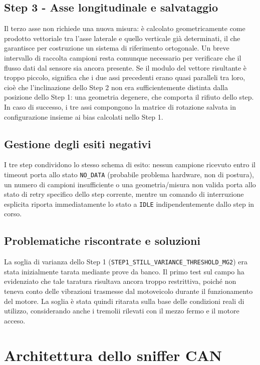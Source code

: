 \subsection{Step 3 - Asse longitudinale e salvataggio}
Il terzo asse non richiede una nuova misura: è calcolato geometricamente come
prodotto vettoriale tra l'asse laterale e quello verticale già determinati,
il che garantisce per costruzione un sistema di riferimento ortogonale. Un
breve intervallo di raccolta campioni resta comunque necessario per
verificare che il flusso dati dal sensore sia ancora presente. Se il modulo
del vettore risultante è troppo piccolo, significa che i due assi precedenti
erano quasi paralleli tra loro, cioè che l'inclinazione dello Step 2 non era
sufficientemente distinta dalla posizione dello Step 1: una geometria
degenere, che comporta il rifiuto dello step. In caso di successo, i tre
assi compongono la matrice di rotazione salvata in configurazione insieme ai
bias calcolati nello Step 1.

\subsection{Gestione degli esiti negativi}
I tre step condividono lo stesso schema di esito: nessun campione ricevuto
entro il timeout porta allo stato \texttt{NO\_DATA} (probabile problema
hardware, non di postura), un numero di campioni insufficiente o una
geometria/misura non valida porta allo stato di retry specifico dello step
corrente, mentre un comando di interruzione esplicita riporta immediatamente
lo stato a \texttt{IDLE} indipendentemente dallo step in corso.

\subsection{Problematiche riscontrate e soluzioni} \label{subsec:prob_risc_calib_imu}

La soglia di varianza dello Step 1
(\texttt{STEP1\_STILL\_VARIANCE\_THRESHOLD\_MG2}) era stata inizialmente
tarata mediante prove da banco. Il primo test sul campo ha evidenziato che
tale taratura risultava ancora troppo restrittiva, poiché non teneva conto
delle vibrazioni trasmesse dal motoveicolo durante il funzionamento del
motore. La soglia è stata quindi ritarata sulla base delle condizioni reali
di utilizzo, considerando anche i tremolii rilevati con il mezzo fermo e il
motore acceso.

\newpage

\section{Architettura dello sniffer CAN}

